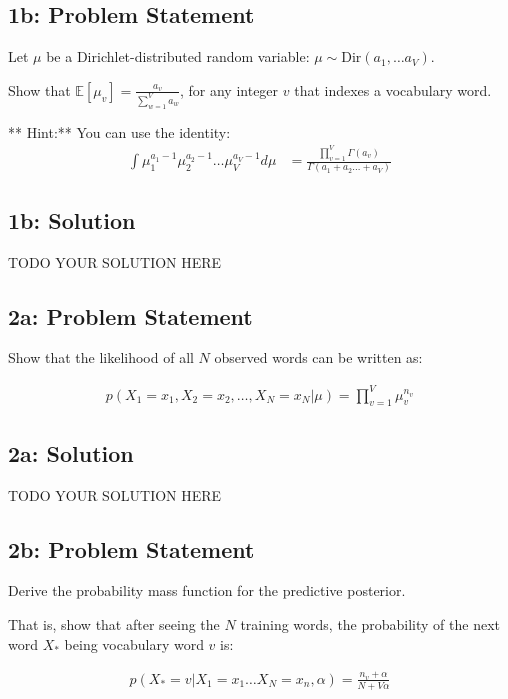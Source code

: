\documentclass[12pt]{article}
\newcommand{\officialdirections}[1]{{\color{blue} #1}}
\begin{document}
\newpage
\officialdirections{
\subsection*{1b: Problem Statement}

Let $\mu$ be a Dirichlet-distributed random variable: $\mu \sim \text{Dir}(a_1, \ldots a_V)$. 

Show that $\mathbb{E}[ \mu_v ] = \frac{a_v}{\sum_{w=1}^V a_w}$, for any integer $v$ that indexes a vocabulary word.

** Hint:** You can use the identity:
\begin{align}
\int \mu_1^{a_1-1} \mu_2^{a_2 - 1} \ldots \mu_V^{a_V-1} d\mu
 &= \frac
 	{\prod_{v=1}^V \Gamma(a_v)}
 	{\Gamma(a_1 + a_2 \ldots + a_V)}
\end{align}
}

\subsection{1b: Solution}
TODO YOUR SOLUTION HERE

\newpage
\officialdirections{
\subsection*{2a: Problem Statement}

Show that the likelihood of all $N$ observed words can be written as:

\begin{align}
p(X_1 = x_1, X_2 = x_2, \ldots, X_N = x_N | \mu) = \prod_{v=1}^V \mu_v^{n_v}
\end{align}
}

\subsection{2a: Solution}


TODO YOUR SOLUTION HERE


\newpage
\officialdirections{
\subsection*{2b: Problem Statement}

Derive the probability mass function for the predictive posterior.

That is, show that after seeing the $N$ training words, the probability of the next word $X_*$ being vocabulary word $v$ is:

\begin{align}
p( X_* = v | X_1 = x_1 \ldots X_N = x_n, \alpha) = \frac{n_v + \alpha}{N + V\alpha}
\end{align}
}
\end{document}
